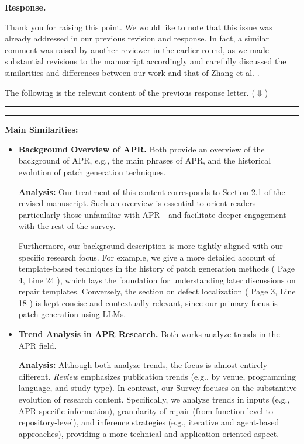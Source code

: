 \documentclass[acmsmall]{acmart}
\begin{document}
	\noindent
	\textbf{Response.}

	Thank you for raising this point. We would like to note that this issue was already addressed in
	our previous revision and response. In fact, a similar comment was raised by another reviewer in
	the earlier round, as we made substantial revisions to the manuscript accordingly and carefully
	discussed the similarities and differences between our work and that of Zhang et al. \cite{S2}.

	The following is the relevant content of the previous response letter. ($\Downarrow$)
	\vspace{1em}
	\hrule \hrule
	\vspace{1em}
	\textbf{Main Similarities:}
	\begin{itemize}
		\item \textbf{Background Overview of APR.}
			\newline
			Both provide an overview of the background of APR, e.g., the main phrases of APR, and
			the historical evolution of patch generation techniques.
			\newline

			\textbf{Analysis:} Our treatment of this content corresponds to
			\color{red}
			Section 2.1
			\color{black}
			of the revised manuscript. Such an overview is essential to orient readers---particularly
			those unfamiliar with APR---and facilitate deeper engagement with the rest of the survey.

			\hspace*{1em}Furthermore, our background description is more tightly aligned with our
			specific research focus. For example, we give a more detailed account of template-based
			techniques in the history of patch generation methods (
			\color{red}
			Page 4, Line 24
			\color{black}
			), which lays the foundation for understanding later discussions on repair templates. Conversely,
			the section on defect localization (
			\color{red}
			Page 3, Line 18
			\color{black}
			) is kept concise and contextually relevant, since our primary focus is patch generation
			using LLMs.
			\newline

		\item \textbf{Trend Analysis in APR Research.}
			\newline
			Both works analyze trends in the APR field.
			\newline

			\textbf{Analysis: }Although both analyze trends, the focus is almost entirely different.
			\textit{Review} emphasizes publication trends (e.g., by venue, programming language, and
			study type). In contrast, our Survey focuses on the substantive evolution of research content.
			Specifically, we analyze trends in inputs (e.g., APR-specific information), granularity
			of repair (from function-level to repository-level), and inference strategies (e.g.,
			iterative and agent-based approaches), providing a more technical and application-oriented
			aspect.
			\newline


\end{itemize}
\end{document}
